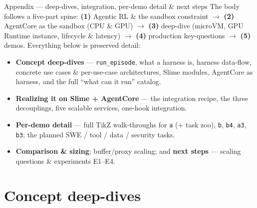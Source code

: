 \documentclass[aspectratio=169]{beamer}
\begin{document}
\begin{frame}{Appendix --- deep-dives, integration, per-demo detail \& next steps}
  \footnotesize The body follows a five-part spine: \textbf{(1)} Agentic RL \& the sandbox constraint
  $\to$ \textbf{(2)} AgentCore as the sandbox (CPU \& GPU) $\to$ \textbf{(3)} deep-dive (microVM, GPU
  Runtime instance, lifecycle \& latency) $\to$ \textbf{(4)} production key-questions $\to$
  \textbf{(5)} demos. Everything below is preserved detail:
  \begin{itemize}\setlength\itemsep{0.1em}
    \item \textbf{Concept deep-dives} --- \texttt{run\_episode}, what a harness is, harness data-flow,
      concrete use cases \& per-use-case architectures, Slime modules, AgentCore as harness, and the
      full ``what can it run'' catalog.
    \item \textbf{Realizing it on Slime + AgentCore} --- the integration recipe, the three decouplings,
      five scalable services, one-hook integration.
    \item \textbf{Per-demo detail} --- full TikZ walk-throughs for \texttt{a} (+ task zoo), \texttt{b},
      \texttt{b4}, \texttt{a3}, \texttt{b3}; the planned SWE / tool / data / security tasks.
    \item \textbf{Comparison \& sizing}; buffer/proxy scaling; and \textbf{next steps} --- scaling
      questions \& experiments E1--E4.
  \end{itemize}
\end{frame}

\section{Concept deep-dives}
\end{document}
